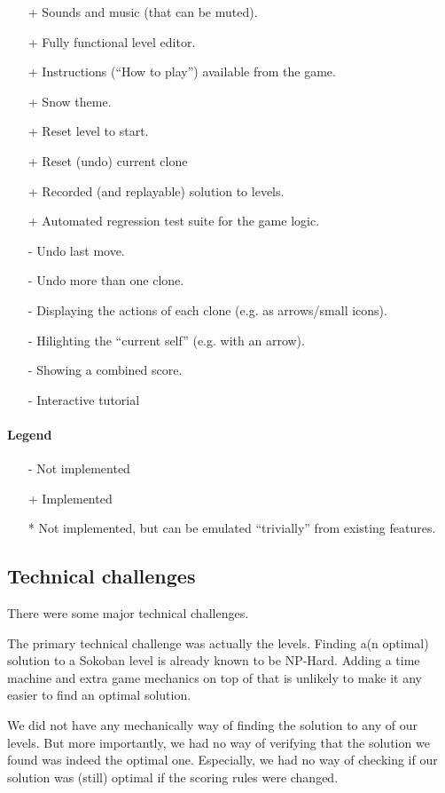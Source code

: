 \begin{itemize}
\item[+] Sounds and music (that can be muted).
\item[+] Fully functional level editor.
\item[+] Instructions (``How to play'') available from the game.
\item[+] Snow theme.
\item[+] Reset level to start.
\item[+] Reset (undo) current clone
\item[+] Recorded (and replayable) solution to levels.
\item[+] Automated regression test suite for the game logic.
\item[-] Undo last move.
\item[-] Undo more than one clone.
\item[-] Displaying the actions of each clone (e.g. as arrows/small icons).
\item[-] Hilighting the ``current self'' (e.g. with an arrow).
\item[-] Showing a combined score.
\item[-] Interactive tutorial
\end{itemize}

\paragraph{Legend}
\begin{itemize}
\item[-] Not implemented
\item[+] Implemented
\item[*] Not implemented, but can be emulated ``trivially'' from existing
 features.
\end{itemize}

\subsection{Technical challenges}
There were some major technical challenges.

The primary technical challenge was actually the levels.  Finding a(n
optimal) solution to a Sokoban level is already known to be NP-Hard.
Adding a time machine and extra game mechanics on top of that is
unlikely to make it any easier to find an optimal solution.

We did not have any mechanically way of finding the solution to any of
our levels.  But more importantly, we had no way of verifying that the
solution we found was indeed the optimal one.  Especially, we had no
way of checking if our solution was (still) optimal if the scoring rules
were changed.

